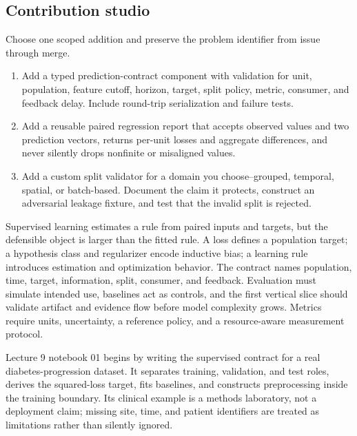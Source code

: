 \subsection*{Contribution studio}

Choose one scoped addition and preserve the problem identifier from issue
through merge.

\begin{enumerate}[label=\textbf{SLC-PR\arabic*.},leftmargin=*,itemsep=0.65em]
  \item Add a typed prediction-contract component with validation for unit,
  population, feature cutoff, horizon, target, split policy, metric, consumer,
  and feedback delay. Include round-trip serialization and failure tests.
  \item Add a reusable paired regression report that accepts observed values
  and two prediction vectors, returns per-unit losses and aggregate differences,
  and never silently drops nonfinite or misaligned values.
  \item Add a custom split validator for a domain you choose--grouped,
  temporal, spatial, or batch-based. Document the claim it protects, construct
  an adversarial leakage fixture, and test that the invalid split is rejected.
\end{enumerate}

\begin{chapterreview}
Supervised learning estimates a rule from paired inputs and targets, but the
defensible object is larger than the fitted rule. A loss defines a population
target; a hypothesis class and regularizer encode inductive bias; a learning
rule introduces estimation and optimization behavior. The contract names
population, time, target, information, split, consumer, and feedback.
Evaluation must simulate intended use, baselines act as controls, and the first
vertical slice should validate artifact and evidence flow before model
complexity grows. Metrics require units, uncertainty, a reference policy, and a
resource-aware measurement protocol.
\end{chapterreview}

\begin{notebooklink}
Lecture 9 notebook 01 begins by writing the supervised contract for a real
diabetes-progression dataset. It separates training, validation, and test roles,
derives the squared-loss target, fits baselines, and constructs preprocessing
inside the training boundary. Its clinical example is a methods laboratory,
not a deployment claim; missing site, time, and patient identifiers are treated
as limitations rather than silently ignored.
\end{notebooklink}
